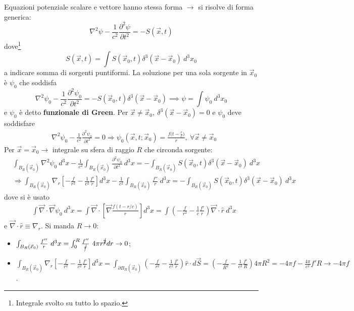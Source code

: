 \documentclass[10pt, a4paper]{scrartcl}
\numberwithin{equation}{subsection}
\theoremstyle{style1}
\begin{document}
Equazioni potenziale scalare e vettore hanno stessa forma $\to$ si risolve di forma generica:
\begin{equation}
	\nabla ^2 \psi  - \frac{1}{c^2}\frac{\partial ^2 \psi }{\partial t^2} = - S(\vec{x},t) 
\end{equation}
dove\footnote{Integrale svolto su tutto lo spazio.}
\begin{equation}
S(\vec{x},t) = \int S(\vec{x}_0,t) \delta ^3(\vec{x}-\vec{x}_0) \ d^3 x_0
\end{equation}
a indicare somma di sorgenti puntiformi. La soluzione per una sola sorgente in $\vec{x}_0$ \`e $\psi _0$ che soddisfa 
\[
\nabla ^2 \psi _0 - \frac{1}{c^2}\frac{\partial ^2 \psi_0}{\partial t^2} = -S(\vec{x}_0,t) \delta ^3 (\vec{x}-\vec{x}_0) \implies \psi =\int\psi _0 \ d^3 x_0 
\] 
e $\psi _0$ \`e detto \textbf{funzionale di Green}. Per $\vec{x}\neq \vec{x}_0, \ \delta ^3 (\vec{x}-\vec{x}_0) = 0$ e $\psi _0$ deve soddisfare
\begin{equation}
	\begin{split}
		&\nabla ^2 \psi _0 - \frac{1}{c^2}\frac{\partial ^2\psi _0}{\partial t^2} = 0\Rightarrow \psi _0(\vec{x},t;\vec{x}_0) = \frac{f\big(t - \frac{r}{c}\big) }{r}, \ \forall \vec{x}\neq \vec{x}_0 
	\end{split}
\end{equation}
Per $\vec{x}=\vec{x}_0 \to$ integrale su sfera di raggio $R$ che circonda sorgente:
\[
\begin{split}
	&\int_{B_R(\vec{x}_0)} \nabla ^2 \psi _0 \ d^3 x  - \frac{1}{c^2}\int_{B_R (\vec{x}_0)}  \frac{\partial ^2 \psi _0}{\partial t^2} \ d^3 x = - \int_{B_R(\vec{x}_0)} S(\vec{x}_0,t) \delta ^3 (\vec{x}-\vec{x}_0) \ d^3 x\\
	&\Rightarrow \int_{B_R(\vec{x}_0)} \nabla _r \left[ - \frac{f}{r^2}-\frac{1}{c^2}\frac{f'}{r} \right] d^3 x - \frac{1}{c^2}\int_{B_R(\vec{x}_0)} \frac{f''}{r}\ d^3 x = - \int_{B_R(\vec{x}_0)} S(\vec{x}_0, t) \delta ^3(\vec{x}-\vec{x}_0) \ d^3 x
\end{split}
\] 
dove si \`e usato 
\[
\begin{split}
	& \int \vec{\nabla }\cdot \vec{\nabla }\psi _0 \ d^3 x = \int \vec{\nabla }\cdot \left[ \vec{\nabla } \frac{f(t- r / c)}{r} \right] d^3 x= \int \left(-\frac{f}{r^2}-\frac{1}{c}\frac{f'}{r}\right) \vec{\nabla }\cdot \hat{r} \ d^3 x
\end{split}
\] 
e $\vec{\nabla }\cdot \hat{r}\equiv \nabla _r$. Si manda $R\to 0$:
\begin{itemize}
	\item $\int_{B_R(\vec{x}_0)} \frac{f''}{r}\ d^3 x = \int_{0} ^R \frac{f''}{\cancel{r}} \ 4\pi r^{\cancel{2}} dr \to 0$;
	\item $\int_{B_R(\vec{x}_0)} \nabla _r \left[ - \frac{f}{r^2}-\frac{1}{c^2}\frac{f'}{r} \right] d^3 x = \int_{\partial B_R(\vec{x}_0)} \left(-\frac{f}{r^2}- \frac{1}{c^2}\frac{f'}{r}\right) \hat{r}\cdot d\vec{S}= \left(-\frac{f}{R^2}-\frac{1}{c^2}\frac{f'}{R}\right) 4\pi R^2 = - 4 \pi f - \frac{4\pi}{c^2}f' R \to - 4\pi f $.
\end{itemize}
\end{document}
